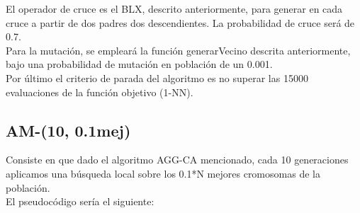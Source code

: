 El operador de cruce es el BLX, descrito anteriormente, para generar en cada cruce a partir de dos padres dos descendientes. La probabilidad de cruce será de 0.7.\\ 

Para la mutación, se empleará la función generarVecino descrita anteriormente, bajo una probabilidad de mutación en población de un 0.001.\\ 

Por último el criterio de parada del algoritmo es no superar las 15000 evaluaciones de la función objetivo (1-NN).




\subsection{AM-(10, 0.1mej)}
Consiste en que dado el algoritmo AGG-CA mencionado, cada 10 generaciones aplicamos una búsqueda local sobre los 0.1*N mejores cromosomas de la población.\\ 
El pseudocódigo sería el siguiente:


